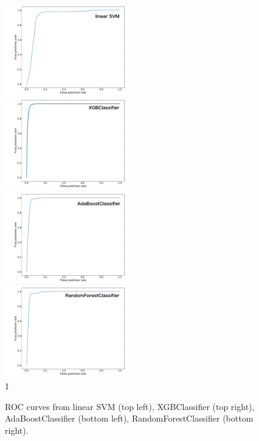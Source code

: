 \begin{figure}[!ht]
    \begin{center}  
    \includegraphics[width=0.5\textwidth]{Fig/fig_HGCAL/ROC-2vars-SVM}~
    \includegraphics[width=0.5\textwidth]{Fig/fig_HGCAL/ROC-2vars-XGBClassifier}\\
    \includegraphics[width=0.5\textwidth]{Fig/fig_HGCAL/ROC-2vars-AdaBoost}~
    \includegraphics[width=0.5\textwidth]{Fig/fig_HGCAL/ROC-2vars-RandomForest}\\1
    \caption{ROC curves from linear SVM (top left), XGBClassifier (top right), AdaBoostClassifier (bottom left), RandomForestClassifier (bottom right).}
    \label{fig:ROCcurves}
    \end{center}
\end{figure}

